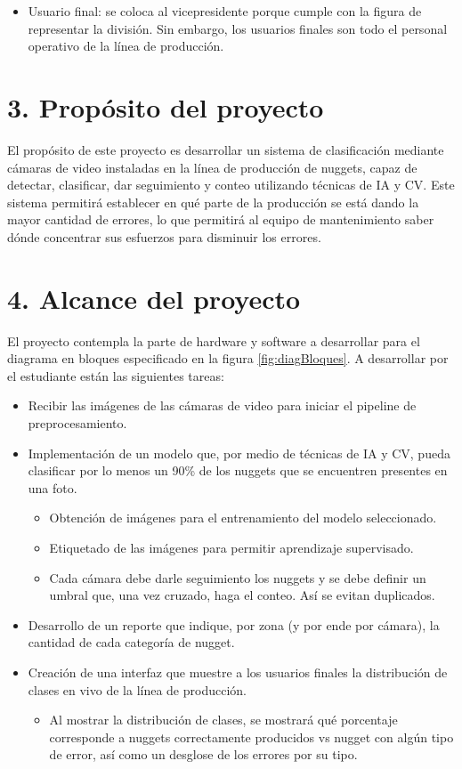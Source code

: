 \documentclass[
11pt, %
]{charter}
\begin{document}
\begin{itemize}
	\item Usuario final: se coloca al vicepresidente porque cumple con la figura de representar la división. Sin embargo, los usuarios finales son todo el personal operativo de la línea de producción.
\end{itemize}

\section{3. Propósito del proyecto}
\label{sec:proposito}
El propósito de este proyecto es desarrollar un sistema de clasificación mediante cámaras de video instaladas en la línea de producción de nuggets, capaz de detectar, clasificar, dar seguimiento y conteo utilizando técnicas de IA y CV. Este sistema permitirá establecer en qué parte de la producción se está dando la mayor cantidad de errores, lo que permitirá al equipo de mantenimiento saber dónde concentrar sus esfuerzos para disminuir los errores. 

\section{4. Alcance del proyecto}
\label{sec:alcance}
El proyecto contempla la parte de hardware y software a desarrollar para el diagrama en bloques especificado en la figura \ref{fig:diagBloques}. A desarrollar por el estudiante están las siguientes tareas:

\begin{itemize}
\item Recibir las imágenes de las cámaras de video para iniciar el pipeline de preprocesamiento.
\item Implementación de un modelo que, por medio de técnicas de IA y CV, pueda clasificar por lo menos un 90\% de los nuggets que se encuentren presentes en una foto.
	\begin{itemize}
	\item Obtención de imágenes para el entrenamiento del modelo seleccionado.
	\item Etiquetado de las imágenes para permitir aprendizaje supervisado.
	\item Cada cámara debe darle seguimiento los nuggets y se debe definir un umbral que, una vez cruzado, haga el conteo. Así se evitan duplicados.
	\end{itemize}
\item Desarrollo de un reporte que indique, por zona (y por ende por cámara), la cantidad de cada categoría de nugget.
\item Creación de una interfaz que muestre a los usuarios finales la distribución de clases en vivo de la línea de producción.
	\begin{itemize}
		\item Al mostrar la distribución de clases, se mostrará qué porcentaje corresponde a nuggets correctamente producidos vs nugget con algún tipo de error, así como un desglose de los errores por su tipo.
	\end{itemize}	
\end{itemize}
\end{document}
